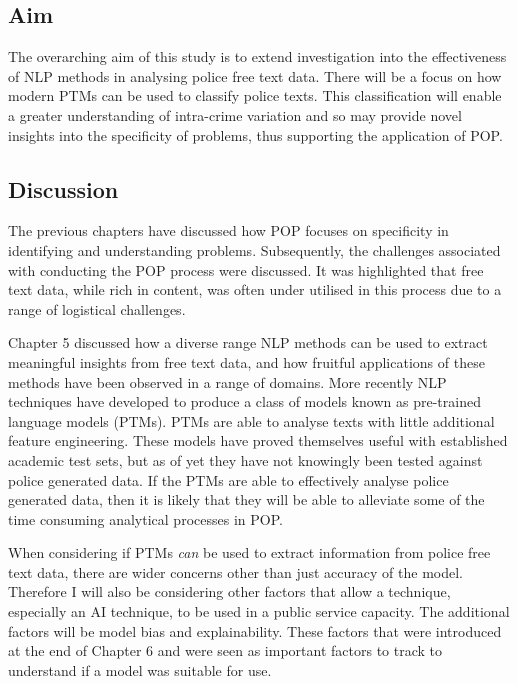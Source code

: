 \subsection{Aim} 

The overarching aim of this study is to extend investigation into the effectiveness of NLP methods in analysing police free text data. There will be a focus on how modern PTMs can be used to classify police texts. This classification will enable a greater understanding of intra-crime variation and so may provide novel insights into the specificity of problems, thus supporting the application of POP. 



\subsection{Discussion} 

The previous chapters have discussed how POP focuses on specificity in identifying  and understanding problems. Subsequently, the challenges associated with conducting the POP process were discussed. It was highlighted that free text data, while rich in content, was often under utilised in this process due to a range of logistical challenges. 

Chapter 5 discussed how a diverse range NLP methods can be used to extract meaningful insights from free text data, and how fruitful applications of these methods have been observed in a range of domains. More recently NLP techniques have developed to produce a class of models known as pre-trained language models (PTMs). PTMs are able to analyse texts with little additional feature engineering. These models have proved themselves useful with established academic test sets, but as of yet they have not knowingly been tested against police generated data. If the PTMs are able to effectively analyse police generated data, then it is likely that they will be able to alleviate some of the time consuming analytical processes in POP. 

When considering if PTMs \emph{can} be used to extract information from police free text data, there are wider concerns other than just accuracy of the model. Therefore I will also be considering other factors that allow a technique, especially an AI technique, to be used in a public service capacity. The additional factors will be model bias and explainability. These factors that were introduced at the end of Chapter 6 and were seen as important factors to track to understand if a model was suitable for use.

